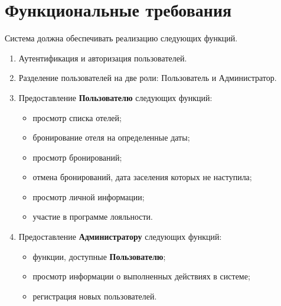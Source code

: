 \section{Функциональные требования}
Система должна обеспечивать реализацию следующих функций.
\begin{enumerate}
	\item Аутентификация и авторизация пользователей.
	\item Разделение пользователей на две роли: Пользователь и Администратор.
	\item Предоставление \textbf{Пользователю} следующих функций:
	\begin{itemize}
		\item просмотр списка отелей;
		\item бронирование отеля на определенные даты;
		\item просмотр бронирований;
		\item отмена бронирований, дата заселения которых не наступила;
		\item просмотр личной информации;
		\item участие в программе лояльности.
	\end{itemize}
	\item Предоставление \textbf{Администратору} следующих функций:
	\begin{itemize}
		\item функции, доступные \textbf{Пользователю};
		\item просмотр информации о выполненных действиях в системе;
		\item регистрация новых пользователей.
	\end{itemize}
\end{enumerate}